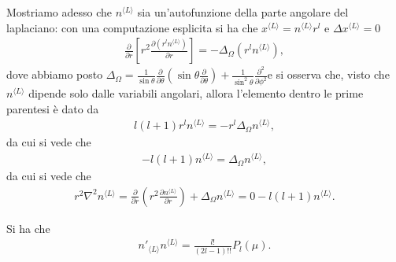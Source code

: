 Mostriamo adesso che $n^{\langle L \rangle}$ sia un'autofunzione della parte angolare del laplaciano: con una computazione esplicita si ha che $x^{\langle L \rangle} = n^{\langle L \rangle} r^l$ e $\Delta x^{\langle L \rangle} = 0$
\begin{align}
	\frac{\partial}{\partial r} \left[ r^2 \frac{\partial (r^{l} n^{\langle L \rangle})}{\partial r} \right] = -\Delta_\Omega (r^l n^{\langle L \rangle}),  
\end{align}
dove abbiamo posto $\Delta_\Omega = \frac{1}{\sin{\theta}} \frac{\partial}{\partial \theta}(\sin{\theta} \frac{\partial}{\partial \theta}) + \frac{1}{\sin^2{\theta}} \frac{\partial^2}{\partial \phi^2}$e si osserva che, visto che $n^{\langle L \rangle}$ dipende solo dalle variabili angolari, allora l'elemento dentro le prime parentesi è dato da
\begin{align}
	l(l+1) r^{l} n^{\langle L \rangle} = -r^l \Delta_\Omega n^{\langle L \rangle}, 
\end{align}
da cui si vede che
\begin{align}
	-l(l+1) n^{\langle L \rangle} = \Delta_\Omega n^{\langle L \rangle},
\end{align}
da cui si vede che
\begin{align}
	r^2 \nabla^2 n^{\langle L \rangle} = \frac{\partial}{\partial r} \left( r^2 \frac{\partial n^{\langle L \rangle}}{\partial r} \right) + \Delta_\Omega n^{\langle L \rangle} = 0 - l(l+1) n^{\langle L \rangle}.
\end{align}
\begin{prop}
Si ha che
\begin{align}
	n'_{\langle L \rangle} n^{\langle L \rangle} = \frac{l!}{(2l-1)!!}P_l(\mu).
\end{align}
\end{prop}
